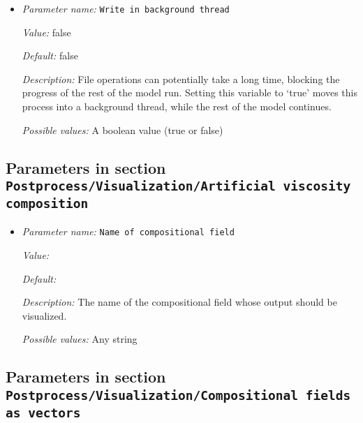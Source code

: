 \begin{itemize}
{\it Default:} 2147483647


{\it Description:} The maximum number of time steps between each generation of graphical output files.


{\it Possible values:} An integer $n$ such that $0\leq n \leq 2147483647$
\item {\it Parameter name:} {\tt Write in background thread}
\label{parameters:Postprocess/Visualization/Write in background thread}


{\it Value:} false


{\it Default:} false


{\it Description:} File operations can potentially take a long time, blocking the progress of the rest of the model run. Setting this variable to `true' moves this process into a background thread, while the rest of the model continues.


{\it Possible values:} A boolean value (true or false)
\end{itemize}



\subsection{Parameters in section \tt Postprocess/Visualization/Artificial viscosity composition}
\label{parameters:Postprocess/Visualization/Artificial_20viscosity_20composition}

\begin{itemize}
\item {\it Parameter name:} {\tt Name of compositional field}
\label{parameters:Postprocess/Visualization/Artificial viscosity composition/Name of compositional field}


{\it Value:} 


{\it Default:} 


{\it Description:} The name of the compositional field whose output should be visualized. 


{\it Possible values:} Any string
\end{itemize}

\subsection{Parameters in section \tt Postprocess/Visualization/Compositional fields as vectors}
\label{parameters:Postprocess/Visualization/Compositional_20fields_20as_20vectors}

